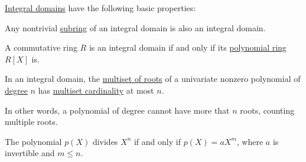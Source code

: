 \begin{proposition}\label{thm:def:integral_domain}
  \hyperref[def:integral_domain]{Integral domains} have the following basic properties:
  \begin{thmenum}
     Any nontrivial \hyperref[def:ring/submodel]{subring} of an integral domain is also an integral domain.

     A commutative ring \( R \) is an integral domain if and only if its \hyperref[def:polynomial_algebra]{polynomial ring} \( R[X] \) is.

     In an integral domain, the \hyperref[def:polynomial_root]{multiset of roots} of a univariate nonzero polynomial of \hyperref[def:polynomial_degree]{degree} \( n \) has \hyperref[def:multiset]{multiset cardinality} at most \( n \).

    In other words, a polynomial of degree cannot have more that \( n \) roots, counting multiple roots.

     The polynomial \( p(X) \) divides \( X^n \) if and only if \( p(X) = aX^m \), where \( a \) is invertible and \( m \leq n \).
  \end{thmenum}
\end{proposition}
